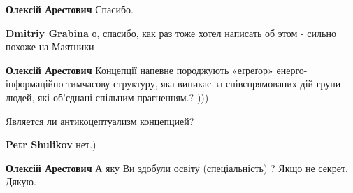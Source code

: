 \begin{itemize}
\begin{itemize}
 
\textbf{Олексій Арестович}
Спасибо.

 
\textbf{Dmitriy Grabina} о, спасибо, как раз тоже хотел написать об этом - сильно похоже на Маятники

 
\textbf{Олексій Арестович} Концепції напевне породжують «еґреґор»
енерго-інформаційно-тимчасову структуру, яка виникає за співспрямованих дій
групи людей, які об'єднані спільним прагненням.? )))
\end{itemize}

 
Является ли антикоцептуализм концепцией?

\begin{itemize}
 
\textbf{Petr Shulikov} нет.)

 
\textbf{Олексій Арестович}
А яку Ви здобули освіту (спеціальність) ?
Якщо не секрет.
Дякую.
\end{itemize}


\end{itemize}
